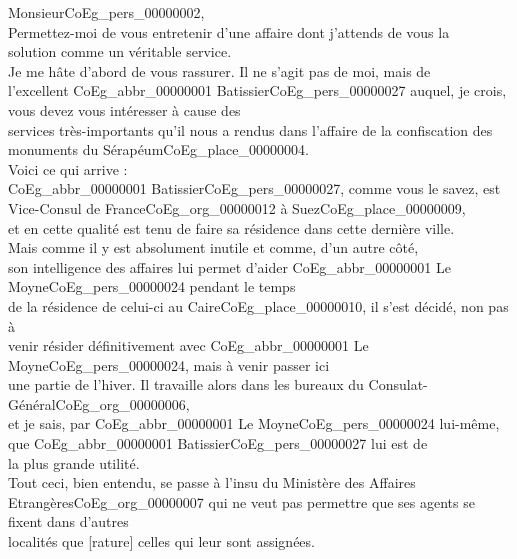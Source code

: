 \documentclass{book}
\begin{document}
\hspace{1cm}Monsieur\gls{CoEg_pers_00000002},\\

\indent Permettez-moi de vous entretenir d’une affaire dont j’attends de vous la\\
solution comme un véritable service.\\
\indent Je me hâte d’abord de vous rassurer. Il ne s’agit pas de moi, mais de\\
l’excellent \gls{CoEg_abbr_00000001} Batissier\gls{CoEg_pers_00000027} auquel, je crois, vous devez vous intéresser à cause des\\
services très-importants qu’il nous a rendus dans l’affaire de la confiscation des\\
monuments du Sérapéum\gls{CoEg_place_00000004}.\\
\indent Voici ce qui arrive :\\
\indent \gls{CoEg_abbr_00000001} Batissier\gls{CoEg_pers_00000027}, comme vous le savez, est Vice-Consul de France\gls{CoEg_org_00000012} à Suez\gls{CoEg_place_00000009},\\
et en cette qualité est tenu de faire sa résidence dans cette dernière ville.\\
\indent Mais comme il y est absolument inutile et comme, d’un autre côté,\\
son intelligence des affaires lui permet d’aider \gls{CoEg_abbr_00000001} Le Moyne\gls{CoEg_pers_00000024} pendant le temps\\
de la résidence de celui-ci au Caire\gls{CoEg_place_00000010}, il s’est décidé, non pas à\\
venir résider définitivement avec \gls{CoEg_abbr_00000001} Le Moyne\gls{CoEg_pers_00000024}, mais à venir passer ici\\
une partie de l’hiver. Il travaille alors dans les bureaux du Consulat-Général\gls{CoEg_org_00000006},\\
et je sais, par \gls{CoEg_abbr_00000001} Le Moyne\gls{CoEg_pers_00000024} lui-même, que \gls{CoEg_abbr_00000001} Batissier\gls{CoEg_pers_00000027} lui est de\\
la plus grande utilité.\\
\indent Tout ceci, bien entendu, se passe à l’insu du Ministère des Affaires\\
Etrangères\gls{CoEg_org_00000007} qui ne veut pas permettre que ses agents se fixent dans d’autres\\
localités que [rature] celles qui leur sont assignées.\\
\end{document}
